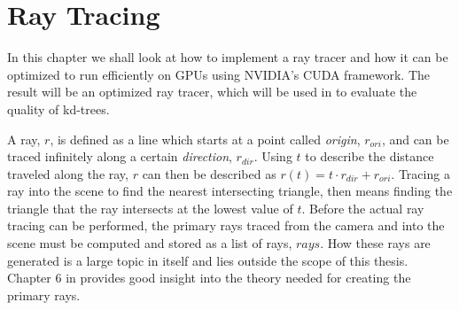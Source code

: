 


\chapter{Ray Tracing}\label{chp:rayTracing}





In this chapter we shall look at how to implement a ray tracer and how it can be
optimized to run efficiently on GPUs using NVIDIA's CUDA framework. The result
will be an optimized ray tracer, which will be used in 
to evaluate the quality of kd-trees.

A ray, $r$, is defined as a line which starts at a point called \textit{origin},
$r_{ori}$, and can be traced infinitely along a certain \textit{direction},
$r_{dir}$. Using $t$ to describe the distance traveled along the ray, $r$ can
then be described as $r(t) = t \cdot r_{dir} + r_{ori}$. Tracing a ray into the
scene to find the nearest intersecting triangle, then means finding the triangle
that the ray intersects at the lowest value of $t$. Before the actual ray
tracing can be performed, the primary rays traced from the camera and into the
scene must be computed and stored as a list of rays, $rays$. How these rays are
generated is a large topic in itself and lies outside the scope of this
thesis. Chapter 6 in  provides good insight into the theory
needed for creating the primary rays.

